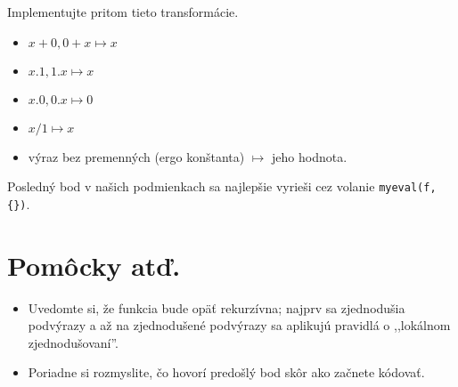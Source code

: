 \documentclass{amsart}
\begin{document}
Implementujte pritom tieto transformácie.
\begin{itemize}
\item $x+0,0+x\mapsto x$
\item $x.1,1.x\mapsto x$
\item $x.0,0.x\mapsto 0$
\item $x/1\mapsto x$
\item výraz bez premenných (ergo konštanta) $\mapsto$ jeho hodnota.
\end{itemize}
Posledný bod v našich podmienkach sa najlepšie vyrieši cez volanie 
{\tt myeval(f,\{\})}.

\begin{framed}

\end{framed}

\section{Pomôcky atď.}
\begin{itemize}
\item
Uvedomte si, že funkcia bude opäť rekurzívna; najprv sa zjednodušia podvýrazy a
až na zjednodušené podvýrazy sa aplikujú pravidlá o ,,lokálnom zjednodušovaní''.
\item Poriadne si rozmyslite, čo hovorí predošlý bod skôr ako začnete kódovať.
\end{itemize}
\end{document}

